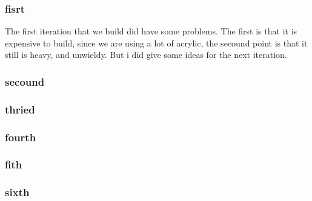 \subsubsection{fisrt}
The first iteration that we build did have some problems.
The first is that it is expensive to build, since we are using a lot of acrylic, the secound point is that it still is heavy, and unwieldy.
But i did give some ideas for the next iteration.

\subsubsection{secound}


\subsubsection{thried}


\subsubsection{fourth}


\subsubsection{fith}

\subsubsection{sixth}

